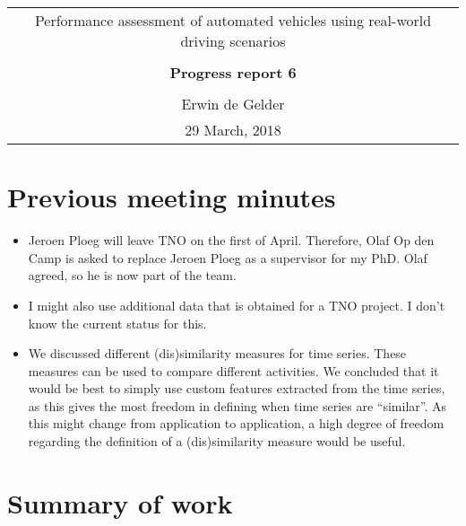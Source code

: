 \documentclass[10pt,final,a4paper,oneside,onecolumn]{article}
\newcommand{\progressreportnumber}{6}
\renewcommand{\author}{Erwin de Gelder}
\renewcommand{\date}{29 March, 2018}
\renewcommand{\title}{Performance assessment of automated vehicles using real-world driving scenarios}
\begin{document}
	
\begin{center}
	\begin{tabular}{c}
		\title \\ \\
		\textbf{\huge Progress report \progressreportnumber} \\ \\
		\author \\ 
		\date
	\end{tabular}
\end{center}

\section{Previous meeting minutes}

\begin{itemize}
	\item Jeroen Ploeg will leave TNO on the first of April. Therefore, Olaf Op den Camp is asked to replace Jeroen Ploeg as a supervisor for my PhD. Olaf agreed, so he is now part of the team.
	\item I might also use additional data that is obtained for a TNO project. I don't know the current status for this.
	\item We discussed different (dis)similarity measures for time series. These measures can be used to compare different activities. We concluded that it would be best to simply use custom features extracted from the time series, as this gives the most freedom in defining when time series are ``similar''. As this might change from application to application, a high degree of freedom regarding the definition of a (dis)similarity measure would be useful.
\end{itemize}

\section{Summary of work}
\end{document}
